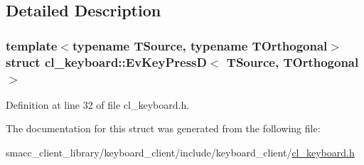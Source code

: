 \subsection{Detailed Description}
\subsubsection*{template$<$typename T\+Source, typename T\+Orthogonal$>$\newline
struct cl\+\_\+keyboard\+::\+Ev\+Key\+Press\+D$<$ T\+Source, T\+Orthogonal $>$}



Definition at line 32 of file cl\+\_\+keyboard.\+h.



The documentation for this struct was generated from the following file\+:\begin{DoxyCompactItemize}
\item 
smacc\+\_\+client\+\_\+library/keyboard\+\_\+client/include/keyboard\+\_\+client/\hyperlink{cl__keyboard_8h}{cl\+\_\+keyboard.\+h}\end{DoxyCompactItemize}
